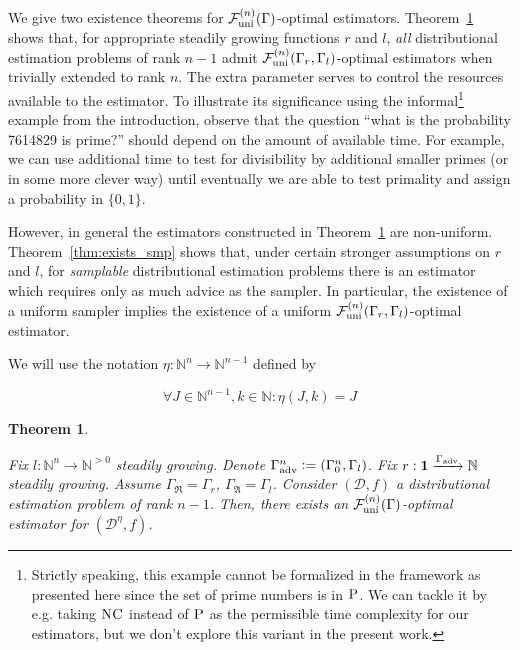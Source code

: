 \documentclass{article}
\numberwithin{equation}{section}
\theoremstyle{definition}
\theoremstyle{plain}
\newtheorem{theorem}{Theorem}[section]
\newcommand{\Nats}{\mathbb{N}}
\newcommand{\NatFun}{\Nats^n \rightarrow}
\newcommand{\Dist}{\mathcal{D}}
\newcommand{\GrowR}{\Gamma_{\mathfrak{R}}}
\newcommand{\GrowA}{\Gamma_{\mathfrak{A}}}
\newcommand{\Fall}{\mathcal{F}}
\newcommand{\FallU}{{\Fall_{\textnormal{uni}}^{(n)}}}
\begin{document}
We give two existence theorems for ${\FallU(\Gamma)}$-optimal estimators. Theorem~\ref{thm:exists_all} shows that, for appropriate steadily growing functions ${r}$ and ${l}$, \emph{all} distributional estimation problems of rank ${n-1}$ admit ${\FallU(\Gamma_r,\Gamma_l)}$-optimal estimators when trivially extended to rank ${n}$. The extra parameter serves to control the resources available to the estimator. To illustrate its significance using the informal\footnote{Strictly speaking, this example cannot be formalized in the framework as presented here since the set of prime numbers is in $\textsc{P}$. We can tackle it by e.g. taking ${\textsc{NC}}$ instead of ${\textsc{P}}$ as the permissible time complexity for our estimators, but we don't explore this variant in the present work.} example from the introduction, observe that the question \enquote{what is the probability 7614829 is prime?} should depend on the amount of available time. For example, we can use additional time to test for divisibility by additional smaller primes (or in some more clever way) until eventually we are able to test primality and assign a probability in $\{0,1\}$. 

However, in general the estimators constructed in Theorem~\ref{thm:exists_all} are non-uniform. Theorem~\ref{thm:exists_smp} shows that, under certain stronger assumptions on ${r}$ and ${l}$, for \emph{samplable} distributional estimation problems there is an estimator which requires only as much advice as the sampler. In particular, the existence of a uniform sampler implies the existence of a uniform ${\FallU(\Gamma_r,\Gamma_l)}$-optimal estimator.

We will use the notation ${\eta: \NatFun \Nats^{n-1}}$ defined by

\[\forall J \in \Nats^{n-1}, k \in \Nats: \eta(J,k)=J\]

\begin{samepage}
\begin{theorem}
\label{thm:exists_all}

Fix ${l: \NatFun \Nats^{>0}}$ steadily growing. Denote ${\Gamma_{\textnormal{adv}}^n:=(\Gamma_0^n,\Gamma_l)}$. Fix ${r: \bm{1} \xrightarrow{\Gamma_{\textnormal{adv}}}\Nats}$ steadily growing. Assume ${\GrowR=\Gamma_r}$, ${\GrowA=\Gamma_l}$. Consider ${(\Dist,f)}$ a distributional estimation problem of rank ${n-1}$. Then, there exists an ${\FallU(\Gamma)}$-optimal estimator for ${(\Dist^\eta,f)}$.

\end{theorem}
\end{samepage}
\end{document}
